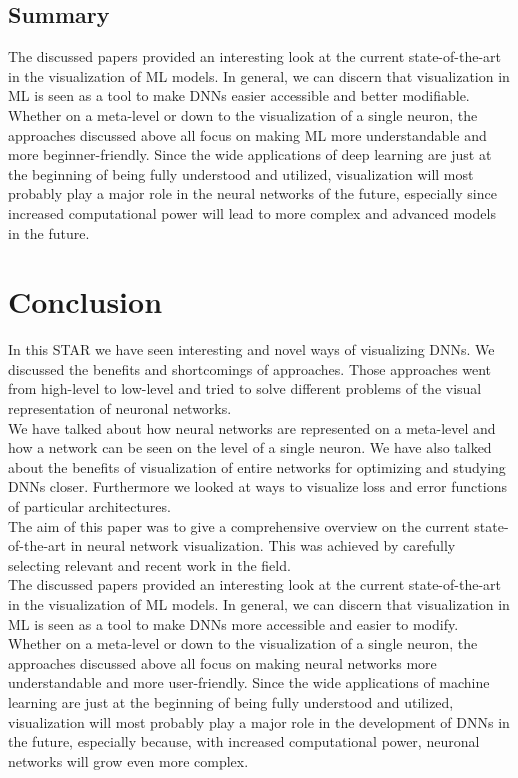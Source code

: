 \documentclass{acmsiggraph}               %
\begin{document}
\subsection{Summary}
The discussed papers provided an interesting look at the current state-of-the-art in the visualization of ML models. In general, we can discern that visualization in ML is seen as a tool to make DNNs easier accessible and better modifiable. Whether on a meta-level or down to the visualization of a single neuron, the approaches discussed above all focus on making ML more understandable and more beginner-friendly. Since the wide applications of deep learning are just at the beginning of being fully understood and utilized, visualization will most probably play a major role in the neural networks of the future, especially since increased computational power will lead to more complex and advanced models in the future.

\section{Conclusion}
In this STAR we have seen interesting and novel ways of visualizing DNNs. We discussed the benefits and shortcomings of approaches. Those approaches went from high-level to low-level and tried to solve different problems of the visual representation of neuronal networks.\\
We have talked about how neural networks are represented on a meta-level and how a network can be seen on the level of a single neuron. We have also talked about the benefits of visualization of entire networks for optimizing and studying DNNs closer. Furthermore we looked at ways to visualize loss and error functions of particular architectures.\\

The aim of this paper was to give a comprehensive overview on the current state-of-the-art in neural network visualization. This was achieved by carefully selecting relevant and recent work in the field.\\

The discussed papers provided an interesting look at the current state-of-the-art in the visualization of ML models. In general, we can discern that visualization in ML is seen as a tool to make DNNs more accessible and easier to modify. Whether on a meta-level or down to the visualization of a single neuron, the approaches discussed above all focus on making neural networks more understandable and more user-friendly. Since the wide applications of machine learning are just at the beginning of being fully understood and utilized, visualization will most probably play a major role in the development of DNNs in the future, especially because, with increased computational power, neuronal networks will grow even more complex.\\
\end{document}
